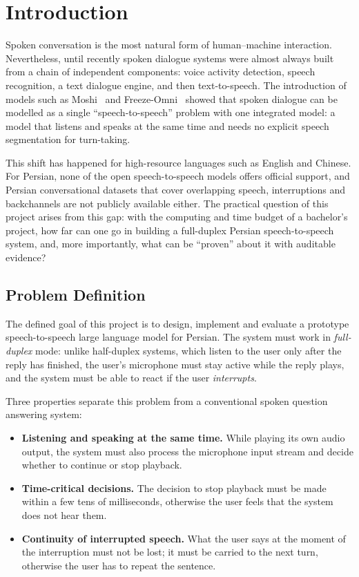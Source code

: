 \chapter{Introduction}
\label{ch:intro}

Spoken conversation is the most natural form of human--machine interaction.
Nevertheless, until recently spoken dialogue systems were almost always built
from a chain of independent components: voice activity detection, speech
recognition, a text dialogue engine, and then text-to-speech. The introduction of
models such as Moshi~\cite{defossez2024moshi} and
Freeze-Omni~\cite{wang2025freezeomni} showed that spoken dialogue can be modelled
as a single ``speech-to-speech'' problem with one integrated model: a model that
listens and speaks at the same time and needs no explicit speech segmentation for
turn-taking.

This shift has happened for high-resource languages such as English and Chinese.
For Persian, none of the open speech-to-speech models offers official support,
and Persian conversational datasets that cover overlapping speech, interruptions
and backchannels are not publicly available either. The practical question of
this project arises from this gap: with the computing and time budget of a
bachelor's project, how far can one go in building a full-duplex Persian
speech-to-speech system, and, more importantly, what can be ``proven'' about it
with auditable evidence?

\section{Problem Definition}
\label{sec:problem}

The defined goal of this project is to design, implement and evaluate a prototype
speech-to-speech large language model for Persian. The system must work in
\emph{full-duplex} mode: unlike half-duplex systems, which listen to the user only
after the reply has finished, the user's microphone must stay active while the
reply plays, and the system must be able to react if the user \emph{interrupts}.

Three properties separate this problem from a conventional spoken question
answering system:

\begin{itemize}
\item \textbf{Listening and speaking at the same time.} While playing its own
      audio output, the system must also process the microphone input stream and
      decide whether to continue or stop playback.
\item \textbf{Time-critical decisions.} The decision to stop playback must be made
      within a few tens of milliseconds, otherwise the user feels that the system
      does not hear them.
\item \textbf{Continuity of interrupted speech.} What the user says at the moment
      of the interruption must not be lost; it must be carried to the next turn,
      otherwise the user has to repeat the sentence.
\end{itemize}

